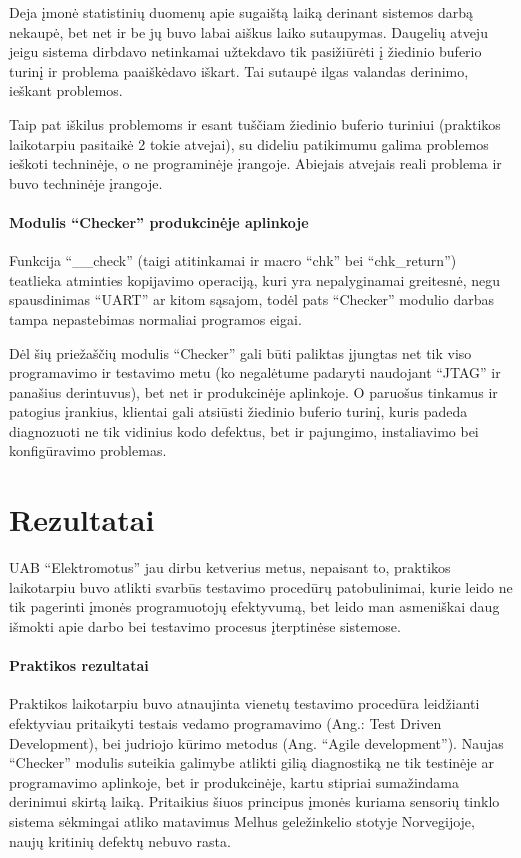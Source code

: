 \documentclass[12pt, a4paper, lithuanian, final]{article}
\begin{document}
Deja įmonė statistinių duomenų apie sugaištą laiką derinant sistemos darbą nekaupė, bet net ir be jų buvo labai aiškus laiko sutaupymas.
Daugelių atveju jeigu sistema dirbdavo netinkamai užtekdavo tik pasižiūrėti į žiedinio buferio turinį ir problema paaiškėdavo iškart. Tai sutaupė ilgas valandas derinimo, ieškant problemos.


Taip pat iškilus problemoms ir esant tuščiam žiedinio buferio turiniui (praktikos laikotarpiu pasitaikė 2 tokie atvejai), su dideliu patikimumu galima problemos ieškoti techninėje, o ne programinėje įrangoje.
Abiejais atvejais reali problema ir buvo techninėje įrangoje.


\paragraph{Modulis "`Checker"' produkcinėje aplinkoje} Funkcija "`\_\_check"' (taigi atitinkamai ir macro "`chk"' bei "`chk\_return"') teatlieka atminties kopijavimo operaciją, kuri yra nepalyginamai greitesnė, negu spausdinimas "`UART"' ar kitom sąsajom, todėl pats "`Checker"' modulio darbas tampa nepastebimas normaliai programos eigai.

Dėl šių priežaščių modulis "`Checker"' gali būti paliktas įjungtas net tik viso programavimo ir testavimo metu (ko negalėtume padaryti naudojant "`JTAG"' ir panašius derintuvus), bet net ir produkcinėje aplinkoje. O paruošus tinkamus ir patogius įrankius, klientai gali atsiūsti žiedinio buferio turinį, kuris padeda diagnozuoti ne tik vidinius kodo defektus, bet ir pajungimo, instaliavimo bei konfigūravimo problemas.




\section{Rezultatai}

UAB "`Elektromotus"' jau dirbu ketverius metus, nepaisant to, praktikos laikotarpiu buvo atlikti svarbūs testavimo procedūrų patobulinimai, kurie leido ne tik pagerinti įmonės programuotojų efektyvumą, bet leido man asmeniškai daug išmokti apie darbo bei testavimo procesus įterptinėse sistemose.

\paragraph{Praktikos rezultatai}

Praktikos laikotarpiu buvo atnaujinta vienetų testavimo procedūra leidžianti efektyviau pritaikyti testais vedamo programavimo (Ang.: Test Driven Development), bei judriojo kūrimo metodus (Ang. "`Agile development"').
Naujas "`Checker"' modulis suteikia galimybe atlikti gilią diagnostiką ne tik testinėje ar programavimo aplinkoje, bet ir produkcinėje, kartu stipriai sumažindama derinimui skirtą laiką.
Pritaikius šiuos principus įmonės kuriama sensorių tinklo sistema sėkmingai atliko matavimus Melhus geležinkelio stotyje Norvegijoje, naujų kritinių defektų nebuvo rasta.
\end{document}
